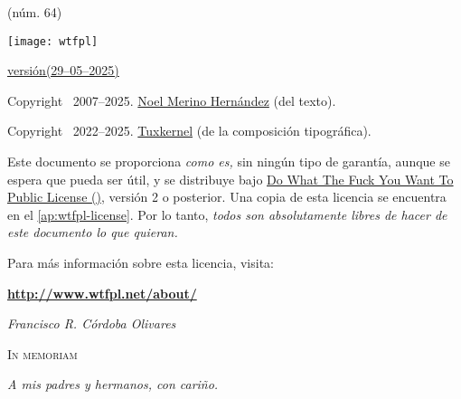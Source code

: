 \documentclass[14pt,twoside,final]{extbook} %
\providecommand\phantomsection{} %
\begin{document}
\begin{center}
(núm. 64)
\end{center}
\newpage
\thispagestyle{empty}
\vspace*{0pt}
\vfill
\protect\phantomsection
{}
\begin{scriptsize}
\begin{flushleft}
\begin{minipage}{7.5cm}
\texttt{[image: wtfpl]}\phantomsection\label{fig:wtfpl} \protect\medskip

\def\fileversion{1.055}
\def\filedate{(29--05--2025)}
\href{https://tuxkernel.github.io/tx/dl/cv.txt}{versión\space\fileversion\space\filedate} \protect\medskip

Copyright \textcopyright\ 2007--2025. \href{noel_merino@yahoo.com.mx}{Noel Merino Hernández} (del texto).

Copyright \textcopyright\ 2022--2025. \href{muxkernel@gmail.com}{Tuxkernel} (de la composición tipográfica). \protect\medskip

Este documento se proporciona \emph{como es,} sin ningún tipo de garantía, aunque se espera que pueda ser útil, y se distribuye bajo \href{http://www.wtfpl.net/}{Do What The Fuck You Want To Public License ()}, versión 2 o posterior. Una copia de esta licencia se encuentra en el \autoref{ap:wtfpl-license}. Por lo tanto, \emph{todos son absolutamente libres de hacer de este documento lo que quieran.} \protect\medskip

Para más información sobre esta licencia, visita: \protect\medskip

\textbf{\url{http://www.wtfpl.net/about/}}
\end{minipage}
\end{flushleft}
\end{scriptsize}
\newpage
\pagestyle{empty}
\phantomsection
{}
\vspace*{48pt}
\begin{flushright}
\textit{Francisco R. Córdoba Olivares}
\end{flushright}
\begin{flushright}
\textsc{In memoriam}
\end{flushright}
\protect\smallskip
\begin{flushright}
\textit{A mis padres y hermanos, con cariño.}
\end{flushright}
\newpage
\pagestyle{empty}
\newpage
\pagestyle{empty}
\end{document}

